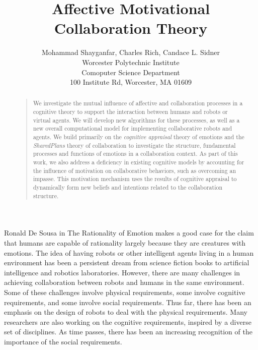 \documentclass[letterpaper]{article}
\begin{document}
%
\title{Affective Motivational Collaboration Theory}
\author{Mohammad Shayganfar, Charles Rich, Candace L. Sidner\\
Worcester Polytechnic Institute\\
Comoputer Science Department\\
100 Institute Rd, Worcester, MA 01609\\
}
\maketitle
\begin{abstract}
\begin{quote}
We investigate the mutual influence of affective and collaboration processes in
a cognitive theory to support the interaction between humans and robots or
virtual agents. We will develop new algorithms for these processes, as well as a
new overall computational model for implementing collaborative robots and
agents. We build primarily on the \textit{cognitive appraisal} theory of
emotions \cite{gratch:domain-independent} and the \textit{SharedPlans} theory
\cite{grosz:plans-discourse} of collaboration to investigate the structure,
fundamental processes and functions of emotions in a collaboration context. As
part of this work, we also address a deficiency in existing cognitive models by
accounting for the influence of motivation on collaborative behaviors, such as
overcoming an impasse. This motivation mechanism uses the results of cognitive
appraisal to dynamically form new beliefs and intentions related to the
collaboration structure.
\end{quote}
\end{abstract}

\noindent Ronald De Sousa in The Rationality of Emotion
\cite{sousa:rationality-emotion} makes a good case for the claim that humans are
capable of rationality largely because they are creatures with emotions. The
idea of having robots or other intelligent agents living in a human environment
has been a persistent dream from science fiction books to artificial
intelligence and robotics laboratories. However, there are many challenges in
achieving collaboration between robots and humans in the same environment. Some
of these challenges involve physical requirements, some involve cognitive
requirements, and some involve social requirements. Thus far, there has been an
emphasis on the design of robots to deal with the physical requirements. Many
researchers are also working on the cognitive requirements, inspired by a
diverse set of disciplines. As time passes, there has been an increasing
recognition of the importance of the social requirements.
\end{document}
